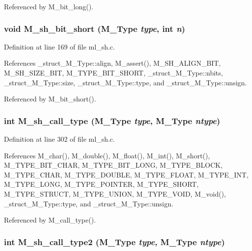 Referenced by M\_\-bit\_\-long().
\subsubsection{\setlength{\rightskip}{0pt plus 5cm}void M\_\-sh\_\-bit\_\-short (\bf{M\_\-Type} {\em type}, int {\em n})}\label{m__sh_8h_8df4d70c8155e78ce835733438caf26e}




Definition at line 169 of file ml\_\-sh.c.

References \_\-struct\_\-M\_\-Type::align, M\_\-assert(), M\_\-SH\_\-ALIGN\_\-BIT, M\_\-SH\_\-SIZE\_\-BIT, M\_\-TYPE\_\-BIT\_\-SHORT, \_\-struct\_\-M\_\-Type::nbits, \_\-struct\_\-M\_\-Type::size, \_\-struct\_\-M\_\-Type::type, and \_\-struct\_\-M\_\-Type::unsign.

Referenced by M\_\-bit\_\-short().
\subsubsection{\setlength{\rightskip}{0pt plus 5cm}int M\_\-sh\_\-call\_\-type (\bf{M\_\-Type} {\em type}, \bf{M\_\-Type} {\em ntype})}\label{m__sh_8h_f3f5facc03dbe7ce158824e90db437a4}




Definition at line 302 of file ml\_\-sh.c.

References M\_\-char(), M\_\-double(), M\_\-float(), M\_\-int(), M\_\-short(), M\_\-TYPE\_\-BIT\_\-CHAR, M\_\-TYPE\_\-BIT\_\-LONG, M\_\-TYPE\_\-BLOCK, M\_\-TYPE\_\-CHAR, M\_\-TYPE\_\-DOUBLE, M\_\-TYPE\_\-FLOAT, M\_\-TYPE\_\-INT, M\_\-TYPE\_\-LONG, M\_\-TYPE\_\-POINTER, M\_\-TYPE\_\-SHORT, M\_\-TYPE\_\-STRUCT, M\_\-TYPE\_\-UNION, M\_\-TYPE\_\-VOID, M\_\-void(), \_\-struct\_\-M\_\-Type::type, and \_\-struct\_\-M\_\-Type::unsign.

Referenced by M\_\-call\_\-type().
\subsubsection{\setlength{\rightskip}{0pt plus 5cm}int M\_\-sh\_\-call\_\-type2 (\bf{M\_\-Type} {\em type}, \bf{M\_\-Type} {\em ntype})}\label{m__sh_8h_7e81b132d025b2e7cb5fecf3bc3feadc}




